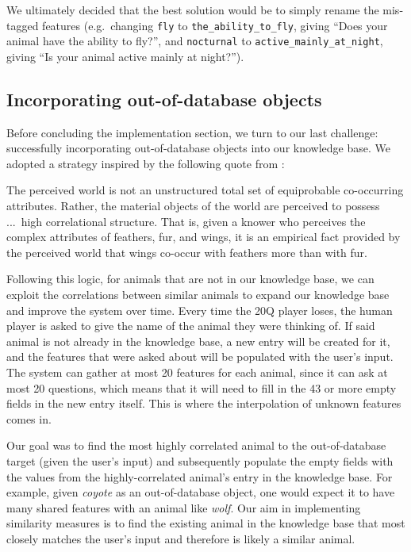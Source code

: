 \documentclass[11pt,a4paper]{article}
\begin{document}
We ultimately decided that the best solution would be to simply rename the mis-tagged features (e.g.\ changing \texttt{fly} to \texttt{the\_ability\_to\_fly}, giving ``Does your animal have the ability to fly?'', and \texttt{nocturnal} to \texttt{active\_mainly\_at\_night}, giving ``Is your animal active mainly at night?'').

\subsection{Incorporating out-of-database objects}
\label{subsec:out-of-db}

Before concluding the implementation section, we turn to our last challenge: successfully incorporating out-of-database objects into our knowledge base. 
We adopted a strategy inspired by the following quote from \citet[29]{Rosch1978}:

\begin{displayquote}
The perceived world is not an unstructured total set of equiprobable co-occurring attributes. 
Rather, the material objects of the world are perceived to possess ...\ high correlational structure.
That is, given a knower who perceives the complex attributes of feathers, fur, and wings, it is an empirical fact provided by the perceived world that wings co-occur with feathers more than with fur. 
\end{displayquote}

Following this logic, for animals that are not in our knowledge base, we can exploit the correlations between similar animals to expand our knowledge base and improve the system over time.
Every time the 20Q player loses, the human player is asked to give the name of the animal they were thinking of. 
If said animal is not already in the knowledge base, a new entry will be created for it, and the features that were asked about will be populated with the user's input. 
The system can gather at most 20 features for each animal, since it can ask at most 20 questions, which means that it will need to fill in the 43 or more empty fields in the new entry itself.
This is where the interpolation of unknown features comes in.

Our goal was to find the most highly correlated animal to the out-of-database target (given the user's input) and subsequently populate the empty fields with the values from the highly-correlated animal's entry in the knowledge base. 
For example, given \textit{coyote} as an out-of-database object, one would expect it to have many shared features with an animal like \textit{wolf}. 
Our aim in implementing similarity measures is to find the existing animal in the knowledge base that most closely matches the user's input and therefore is likely a similar animal.
\end{document}
